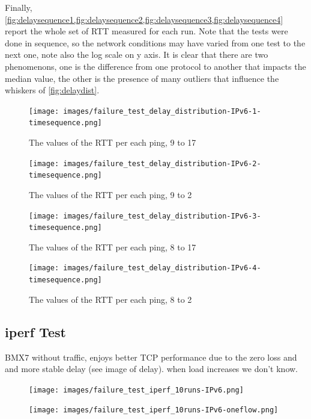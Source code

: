 \documentclass[10pt,onecolumn]{paper}
\begin{document}
Finally,
\cref{fig:delaysequence1,fig:delaysequence2,fig:delaysequence3,fig:delaysequence4}
report the whole set of RTT measured for each run. Note that the tests were done
in sequence, so the network conditions may have varied from one test to the next
one, note also the log scale on y axis. It is clear that there are two
phenomenons, one is the difference from one protocol to another that impacts the
median value, the other is the presence of many outliers that influence the
whiskers of \cref{fig:delaydist}.

\begin{figure}
  \centering
  \texttt{[image: images/failure\_test\_delay\_distribution-IPv6-1-timesequence.png]}
    \caption{The values of the RTT per each ping, 9 to 17}
  \label{fig:delaysequence1}
\end{figure}

\begin{figure}
  \centering
  \texttt{[image: images/failure\_test\_delay\_distribution-IPv6-2-timesequence.png]}
    \caption{The values of the RTT per each ping, 9 to 2}
  \label{fig:delaysequence2}
\end{figure}

\begin{figure}
  \centering
  \texttt{[image: images/failure\_test\_delay\_distribution-IPv6-3-timesequence.png]}
    \caption{The values of the RTT per each ping, 8 to 17}
  \label{fig:delaysequence3}
\end{figure}

\begin{figure}
  \centering
  \texttt{[image: images/failure\_test\_delay\_distribution-IPv6-4-timesequence.png]}
    \caption{The values of the RTT per each ping, 8 to 2}
  \label{fig:delaysequence4}
\end{figure}

\subsection{iperf Test}

BMX7 without traffic, enjoys better TCP performance due to the zero loss and
and more stable delay (see image of delay). when load increases we don't know.
\begin{figure}
  \centering
    \texttt{[image: images/failure\_test\_iperf\_10runs-IPv6.png]}
    \caption{}
  \label{fig:iperfnoflow}
\end{figure}

\begin{figure}
  \centering
    \texttt{[image: images/failure\_test\_iperf\_10runs-IPv6-oneflow.png]}
    \caption{}
  \label{fig:iperfoneflow}
\end{figure}
\end{document}
